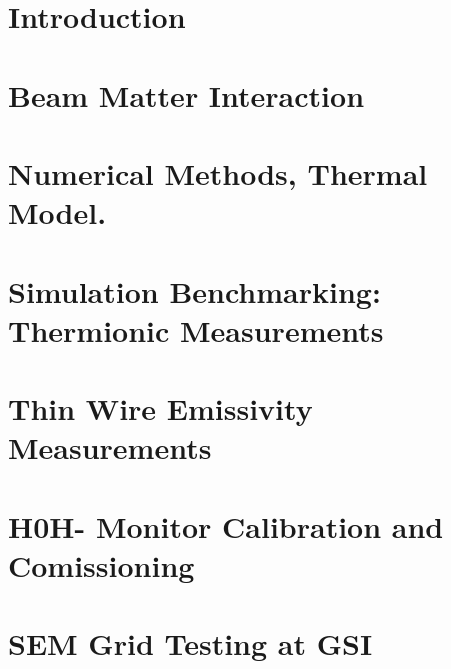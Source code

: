 \documentclass[12pt,twoside,openright]{report}
\begin{document}


\pagestyle{plain}




\chapter{Introduction} 
\label{ch:Introduction}


\chapter{Beam Matter Interaction} 
\label{ch:BeamMatterInter}


\chapter{Numerical Methods, Thermal Model.}
\label{ch:TempModeling}


\chapter{Simulation Benchmarking: Thermionic Measurements}
\label{ch:ThermoMeasur}


\chapter{Thin Wire Emissivity Measurements}
\label{ch:EmissivityMeas}


\chapter{H0H- Monitor Calibration and Comissioning}
\label{ch:H0Hm}


\chapter{SEM Grid Testing at GSI}
\label{ch:GSIMEasurements}


%


\printbibliography 
\end{document}
